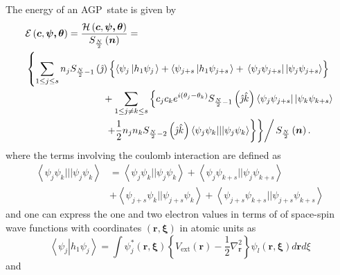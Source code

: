 \documentclass[aps,preprint]{revtex4}%
\begin{document}
The energy of an AGP\ state is given by
\begin{align}
&  \mathcal{E}\left(  \boldsymbol{c},\boldsymbol{\psi,\theta}\right)
=\frac{\mathcal{H}\left(  \boldsymbol{c},\boldsymbol{\psi,\theta}\right)
}{S_{\frac{N}{2}}\left(  \boldsymbol{n}\right)  }=\nonumber\\
&  \left\{  \sum_{1\leq j\leq s}n_{j}S_{\frac{N}{2}-1}\left(  \hat{\jmath
}\right)  \left\{  \overset{}{\left\langle \psi_{j}\left\vert h_{1}\psi
_{j}\right.  \right\rangle +\left\langle \psi_{j+s}\left\vert h_{1}\psi
_{j+s}\right.  \right\rangle }+\,\left\langle \psi_{j}\psi_{j+s}\right\vert
\left\vert \psi_{j}\psi_{j+s}\right\rangle \right\}  \right.  \nonumber\\
&  \qquad\qquad\qquad\qquad+\sum_{1\leq j\neq k\leq s}\left\{  c_{j}%
c_{k}e^{i\left(  \theta_{j}-\theta_{k}\right)  }S_{\frac{N}{2}-1}\left(
\hat{\jmath}\hat{k}\right)  \left\langle \psi_{j}\psi_{j+s}\right\vert
\left\vert \psi_{k}\psi_{k+s}\right\rangle \right.  \nonumber\\
&  \qquad\qquad\qquad\qquad\left.  \left.  \left.  +\frac{1}{2}\overset
{}{n_{j}n_{k}S_{\frac{N}{2}-2}\left(  \hat{\jmath}\hat{k}\right)  \left\langle
\psi_{j}\psi_{k}|||\psi_{j}\psi_{k}\right\rangle }\right\}  \right\}  \right/
S_{\frac{N}{2}}\left(  \boldsymbol{n}\right)  .\label{EnFunc}%
\end{align}
where the terms involving the coulomb interaction are defined as
\begin{align}
\left\langle \psi_{j}\psi_{k}|||\psi_{j}\psi_{k}\right\rangle  &
=\left\langle \psi_{j}\psi_{k}||\psi_{j}\psi_{k}\right\rangle +\left\langle
\psi_{j}\psi_{k+s}||\psi_{j}\psi_{k+s}\right\rangle \nonumber\\
&  +\left\langle \psi_{j+s}\psi_{k}||\psi_{j+s}\psi_{k}\right\rangle
+\left\langle \psi_{j+s}\psi_{k+s}||\psi_{j+s}\psi_{k+s}\right\rangle
\end{align}
and one can express the one and two electron values in terms of of space-spin
wave functions with coordinates $\left(  \boldsymbol{r,\xi}\right)  $ in
atomic units as
\begin{equation}
\left\langle \psi_{j}\left\vert h_{1}\psi_{j}\right.  \right\rangle =\int
\psi_{j}^{\ast}\left(  \boldsymbol{r,\xi}\right)  \left\{  V_{\text{ext}%
}\left(  \boldsymbol{r}\right)  -\frac{1}{2}\nabla_{\boldsymbol{r}}%
^{2}\right\}  \psi_{l}\left(  \boldsymbol{r,\xi}\right)  d\boldsymbol{r}d\xi
\end{equation}
and
\end{document}
